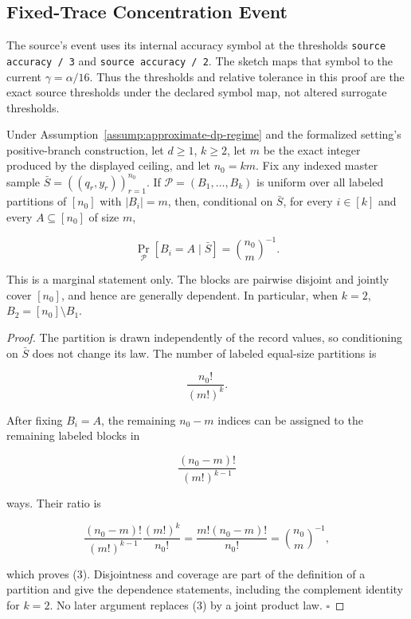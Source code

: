 \subsection{Fixed-Trace Concentration Event}\label{app:step_006}


The source's event uses its internal accuracy symbol at the thresholds
\texttt{source accuracy / 3} and \texttt{source accuracy / 2}.  The  sketch maps
that symbol to the current \(\gamma=\alpha/16\).  Thus the thresholds and
relative tolerance in this proof are the exact source thresholds under the
declared symbol map, not altered surrogate thresholds.



\begin{proposition}\label{prop:step-006-partition}
Under Assumption~\ref{assump:approximate-dp-regime} and the formalized
setting's positive-branch construction, let \(d\geq1\), \(k\geq2\), let
\(m\) be the exact integer produced by the displayed ceiling, and let
\(n_0=km\).  Fix any indexed master sample
\(\bar S=((q_r,y_r))_{r=1}^{n_0}\).  If
\(\mathcal P=(B_1,\ldots,B_k)\) is uniform over all labeled partitions of
\([n_0]\) with \(|B_i|=m\), then, conditional on \(\bar S\), for every
\(i\in[k]\) and every \(A\subseteq[n_0]\) of size \(m\),

\[
 \Pr_{\mathcal P}[B_i=A\mid\bar S]=\binom{n_0}{m}^{-1}.
\tag{3}
\]

This is a marginal statement only.  The blocks are pairwise disjoint and
jointly cover \([n_0]\), and hence are generally dependent.  In particular,
when \(k=2\), \(B_2=[n_0]\setminus B_1\).


\end{proposition}

\begin{proof}
The partition is drawn independently of the record values, so
conditioning on \(\bar S\) does not change its law.  The number of labeled
equal-size partitions is

\[
 \frac{n_0!}{(m!)^k}.
\]

After fixing \(B_i=A\), the remaining \(n_0-m\) indices can be assigned to
the remaining labeled blocks in

\[
 \frac{(n_0-m)!}{(m!)^{k-1}}
\]

ways.  Their ratio is

\[
 \frac{(n_0-m)!}{(m!)^{k-1}}
 \frac{(m!)^k}{n_0!}
 =\frac{m!(n_0-m)!}{n_0!}
 =\binom{n_0}{m}^{-1},
\]

which proves (3).  Disjointness and coverage are part of the definition of
a partition and give the dependence statements, including the complement
identity for \(k=2\).  No later argument replaces (3) by a joint product
law. \(\square\)


\end{proof}

